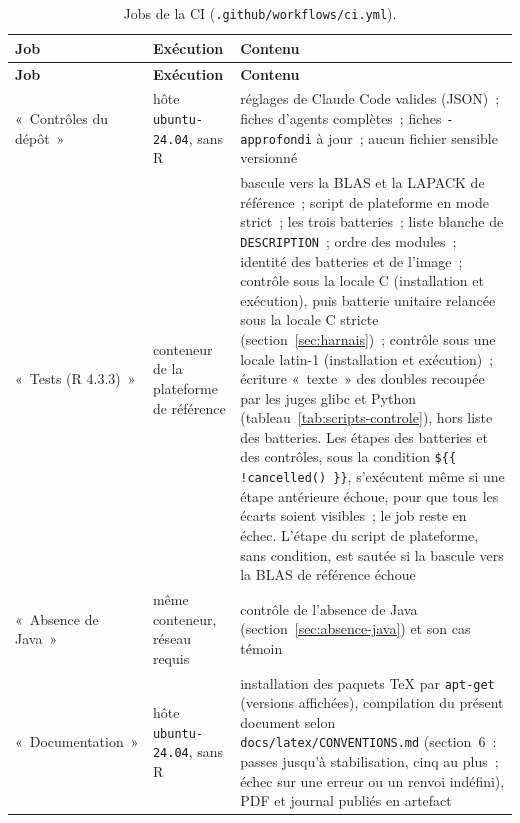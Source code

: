 \documentclass[a4paper,11pt]{article}
\newcommand{\code}[1]{\texttt{\small #1}}
\begin{document}
\begin{center}
\small
{}
\begin{longtable}{@{}p{3.3cm}p{3.2cm}p{8.3cm}@{}}
\caption{Jobs de la CI (\code{.github/workflows/ci.yml}).}
\label{tab:jobs-ci}\\
\rowcolor{tableheader}
\textcolor{financeblue}{\textbf{Job}} &
\textcolor{financeblue}{\textbf{Exécution}} &
\textcolor{financeblue}{\textbf{Contenu}} \\
\endfirsthead
\rowcolor{tableheader}
\textcolor{financeblue}{\textbf{Job}} &
\textcolor{financeblue}{\textbf{Exécution}} &
\textcolor{financeblue}{\textbf{Contenu}} \\
\endhead
«~Contrôles du dépôt~» & hôte \code{ubuntu-24.04}, sans R & réglages de Claude
Code valides (JSON)~; fiches d'agents complètes~; fiches \code{-approfondi} à
jour~; aucun fichier sensible versionné \\
«~Tests (R 4.3.3)~» & conteneur de la plateforme de référence & bascule vers
la BLAS et la LAPACK de référence~; script de plateforme en mode strict~; les
trois batteries~; liste blanche de \code{DESCRIPTION}~; ordre des modules~;
identité des batteries et de l'image~; contrôle sous la locale C
(installation et exécution), puis batterie unitaire relancée sous la locale C
stricte (section~\ref{sec:harnais})~; contrôle sous une locale latin-1
(installation et exécution)~; écriture «~texte~» des doubles
recoupée par les juges glibc et Python (tableau~\ref{tab:scripts-controle}), hors liste des batteries. Les étapes des batteries et des
contrôles, sous la condition \code{\$\{\{ !cancelled() \}\}}, s'exécutent
même si une étape antérieure échoue, pour que tous les écarts soient
visibles~; le job reste en échec. L'étape du script de plateforme, sans
condition, est sautée si la bascule vers la BLAS de référence échoue \\
«~Absence de Java~» & même conteneur, réseau requis & contrôle de l'absence de
Java (section~\ref{sec:absence-java}) et son cas témoin \\
«~Documentation~» & hôte \code{ubuntu-24.04}, sans R & installation des paquets TeX
par \code{apt-get} (versions affichées), compilation du présent document selon
\code{docs/latex/CONVENTIONS.md} (section~6~: passes jusqu'à stabilisation,
cinq au plus~; échec sur une erreur ou un renvoi indéfini), PDF et journal
publiés en artefact \\
\end{longtable}
\end{center}
\end{document}
